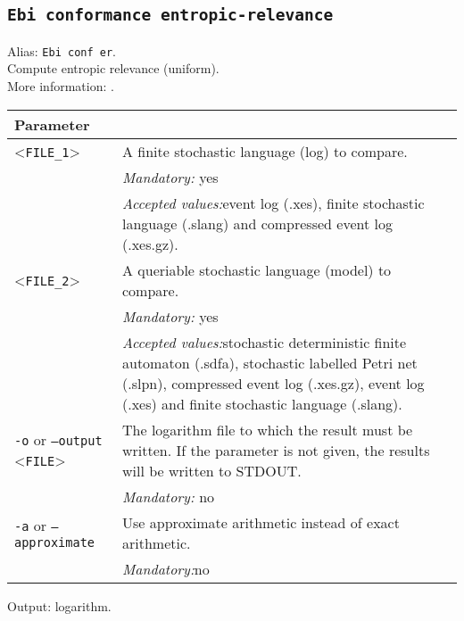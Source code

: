 {\subsection{\texttt{Ebi conformance entropic-relevance}}
Alias: \texttt{Ebi conf er}.\\
Compute entropic relevance (uniform).\\
More information: \cite{DBLP:journals/is/AlkhammashPMG22}.\\
\begin{tabularx}{\linewidth}{lX}
\toprule
Parameter \\\midrule
<\texttt{FILE\_1}>&A finite stochastic language (log) to compare.\\
&\textit{Mandatory:} \quad yes\\
&\textit{Accepted values:}\quad event log (.xes), finite stochastic language (.slang) and compressed event log (.xes.gz).\\
<\texttt{FILE\_2}>&A queriable stochastic language (model) to compare.\\
&\textit{Mandatory:} \quad yes\\
&\textit{Accepted values:}\quad stochastic deterministic finite automaton (.sdfa), stochastic labelled Petri net (.slpn), compressed event log (.xes.gz), event log (.xes) and finite stochastic language (.slang).\\
\texttt{-o} or \texttt{--output} <\texttt{FILE}> &
The logarithm file to which the result must be written. If the parameter is not given, the results will be written to STDOUT.\\
&\textit{Mandatory:} \quad no\\
\texttt{-a} or \texttt{--approximate} & Use approximate arithmetic instead of exact arithmetic.\\
&\textit{Mandatory:}\quad no\\
\bottomrule
\end{tabularx}
Output: logarithm.
}
